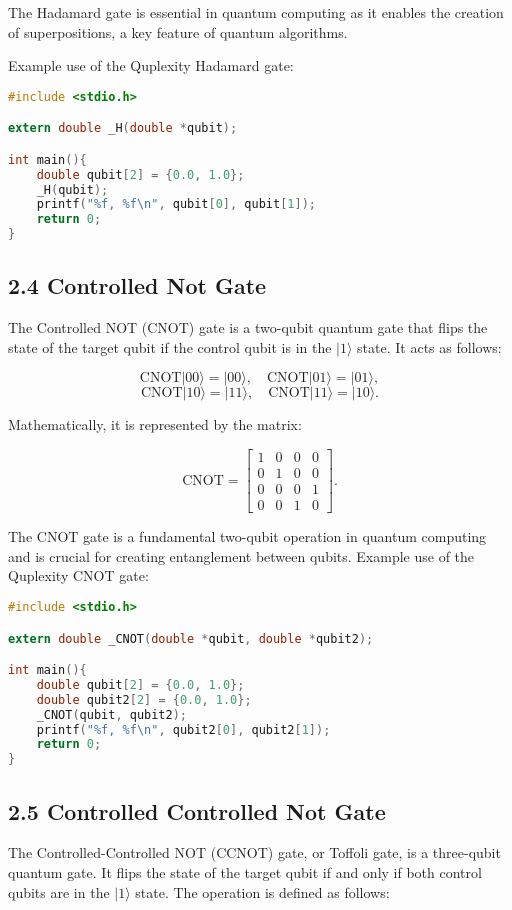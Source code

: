 \documentclass{article}
\begin{document}
The Hadamard gate is essential in quantum computing as it enables the creation of superpositions, a key feature of quantum algorithms.

Example use of the Quplexity Hadamard gate:

\begin{lstlisting}[language=C, frame=single]
#include <stdio.h>

extern double _H(double *qubit);

int main(){
    double qubit[2] = {0.0, 1.0};
    _H(qubit);
    printf("%f, %f\n", qubit[0], qubit[1]);
    return 0;
}
\end{lstlisting}

\subsection*{2.4 Controlled Not Gate}
The Controlled NOT (CNOT) gate is a two-qubit quantum gate that flips the state of the target qubit if the control qubit is in the \(|1\rangle\) state. It acts as follows:

\[
\text{CNOT}|00\rangle = |00\rangle, \quad \text{CNOT}|01\rangle = |01\rangle,
\]
\[
\text{CNOT}|10\rangle = |11\rangle, \quad \text{CNOT}|11\rangle = |10\rangle.
\]

Mathematically, it is represented by the matrix:

\[
\text{CNOT} = \begin{bmatrix}
1 & 0 & 0 & 0 \\
0 & 1 & 0 & 0 \\
0 & 0 & 0 & 1 \\
0 & 0 & 1 & 0
\end{bmatrix}.
\]

The CNOT gate is a fundamental two-qubit operation in quantum computing and is crucial for creating entanglement between qubits.
Example use of the Quplexity CNOT gate:

\begin{lstlisting}[language=C, frame=single]
#include <stdio.h>

extern double _CNOT(double *qubit, double *qubit2);

int main(){
    double qubit[2] = {0.0, 1.0};
    double qubit2[2] = {0.0, 1.0};
    _CNOT(qubit, qubit2);
    printf("%f, %f\n", qubit2[0], qubit2[1]);
    return 0;
}
\end{lstlisting}

\subsection*{2.5 Controlled Controlled Not Gate}
The Controlled-Controlled NOT (CCNOT) gate, or Toffoli gate, is a three-qubit quantum gate. It flips the state of the target qubit if and only if both control qubits are in the \(|1\rangle\) state. The operation is defined as follows:
\end{document}
